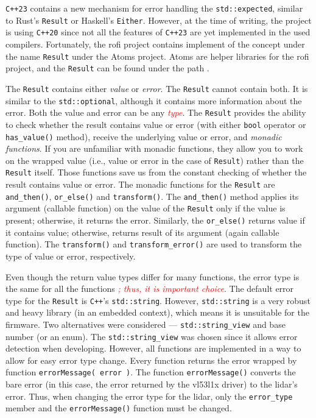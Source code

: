 \documentclass[
  digital,     %
  oneside,     %
  nosansbold,  %
  nocolorbold, %
  nolof,         %
  nolot,         %
]{fithesis4}
\newcommand{\TODO}[1]{\textcolor{red}{\textit{#1}}}
\begin{document}
{{{\verb|C++23| contains a new mechanism for error handling the \lstinline|std::expected|, similar to Rust's \lstinline|Result| or Haskell's \lstinline|Either|. However, at the time of writing, the project is using \verb|C++20| since not all the features of \verb|C++23| are yet implemented in the used compilers. Fortunately, the \acrshort{rofi} project contains implement of the concept under the name \lstinline|Result| under the Atoms project. Atoms are helper libraries for the \acrshort{rofi} project, and the \lstinline|Result| can be found under the path .

The \lstinline|Result| contains either \emph{value} or \emph{error}. The \lstinline|Result| cannot contain both. It is similar to the \lstinline|std::optional|, although it contains more information about the error. Both the value and error can be any \TODO{type}. The \lstinline|Result| provides the ability to check whether the result contains value or error (with either \lstinline|bool| operator or \lstinline|has_value()| method), receive the underlying value or error, and \emph{monadic functions}. If you are unfamiliar with monadic functions, they allow you to work on the wrapped value (i.e., value or error in the case of \lstinline|Result|) rather than the \lstinline|Result| itself. Those functions save us from the constant checking of whether the result contains value or error. The monadic functions for the \lstinline|Result| are \lstinline|and_then()|, \lstinline|or_else()| and \lstinline|transform()|. The \lstinline|and_then()| method applies its argument (callable function) on the value of the \lstinline|Result| only if the value is present; otherwise, it returns the error. Similarly, the \lstinline|or_else()| returns value if it contains value; otherwise, returns result of its argument (again callable function). The \lstinline|transform()| and \lstinline|transform_error()| are used to transform the type of value or error, respectively.

Even though the return value types differ for many functions, the error type is the same for all the functions \TODO{; thus, it is important choice}. The default error type for the \lstinline|Result| is \verb|C++|'s \lstinline|std::string|. However, \lstinline|std::string| is a very robust and heavy library (in an embedded context), which means it is unsuitable for the firmware. Two alternatives were considered --- \lstinline|std::string_view| and base number (or an enum). The \lstinline|std::string_view| was chosen since it allows error detection when developing. However, all functions are implemented in a way to allow for easy error type change. Every function returns the error wrapped by function \lstinline|errorMessage( error )|. The function \lstinline|errorMessage()| converts the bare error (in this case, the error returned by the \gls{vl53l1x} driver) to the \acrshort{lidar}'s error. Thus, when changing the error type for the \acrshort{lidar}, only the \lstinline|error_type| member and the \lstinline|errorMessage()| function must be changed.

}}}
\end{document}
